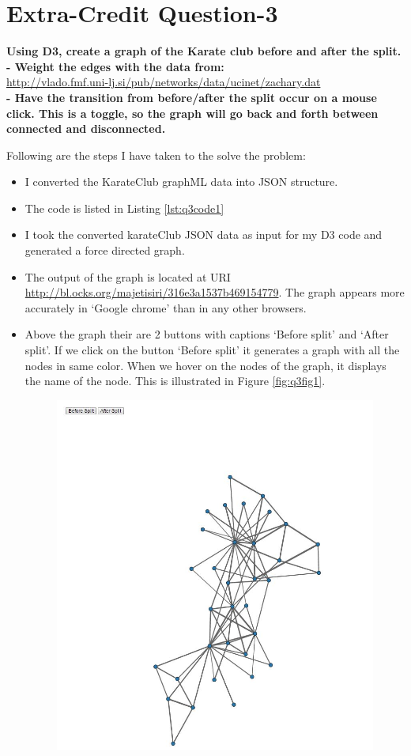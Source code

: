 \chapter{Extra-Credit Question-3}
\label{intro}

\textbf{Using D3, create a graph of the Karate club before and after the split.}\\
\textbf{- Weight the edges with the data from: }\\
\url{http://vlado.fmf.uni-lj.si/pub/networks/data/ucinet/zachary.dat}\\
\textbf{- Have the transition from before/after the split occur on a mouse click.  This is a toggle, so the graph will go back and forth between connected and disconnected.}

Following are the steps I have taken to the solve the problem:
\begin{itemize}
\item  I converted the KarateClub graphML data into JSON structure.
\item The code is listed in Listing \ref{lst:q3code1} 
\item I took the converted karateClub JSON data as input for my D3 code and generated a force directed graph.
\item The output of the graph is located at URI \url {http://bl.ocks.org/majetisiri/316e3a1537b469154779}. The graph appears more accurately in `Google chrome' than in any other browsers.
\item Above the graph their are 2 buttons with captions `Before split' and `After split'. If we click on the button `Before split' it generates a graph with all the nodes in same color. When we hover on the nodes of the graph, it displays the name of the node. This is illustrated in Figure \ref{fig:q3fig1}.
\begin{figure}[h!]
\begin{center}
\includegraphics[scale=0.55, keepaspectratio=true]{figures/2.JPG}

\end{center}
\end{figure}
\end{itemize}
